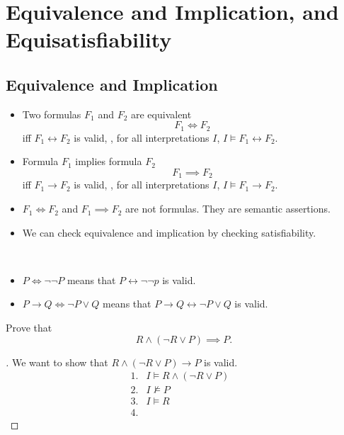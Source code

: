 
\cite{youtube:COSE419-Lecture4-1}
\cite{youtube:COSE419-Lecture4-2}
\cite{youtube:COSE419-Lecture4-3}

\section{Equivalence and Implication, and Equisatisfiability}

\subsection{Equivalence and Implication}
\begin{itemize}
	\item Two formulas $F_1$ and $F_2$ are equivalent \[
		F_1\iff F_2
	\] iff $F_1\leftrightarrow F_2$ is valid, \ie, for all interpretations $I$, $I\models F_1\leftrightarrow F_2$.
	\item Formula $F_1$ implies formula $F_2$ \[
	F_1\implies F_2
	\] iff $F_1\to F_2$ is valid, \ie, for all interpretations $I$, $I\models F_1\to F_2$.
	\item $F_1\iff F_2$ and $F_1\implies F_2$ are not formulas. They are semantic assertions.
	\item We can check equivalence and implication by checking satisfiability.
\end{itemize}
\begin{example}
\ \begin{itemize}
	\item $P\iff\lnot\lnot P$ means that $P\leftrightarrow \lnot\lnot p$ is valid.
	\item $P\to Q\iff \lnot P\lor Q$ means that $P\to Q\leftrightarrow \lnot P\lor Q$ is valid.
\end{itemize}
\end{example}
\begin{exercise}
	Prove that \[
	R\land(\lnot R\lor P)\implies P.
	\]
	\begin{proof}[\sol]
		We want to show that $R\land(\lnot R\lor P)\to P$ is valid.
		\[\begin{array}{lll}
			1. & I\models R\land(\lnot R\lor P) & \\
			2. & I\not\models P & \\
			3. & I\models R & \\
			4. & 
		\end{array}
		\]
	\end{proof}
\end{exercise}

